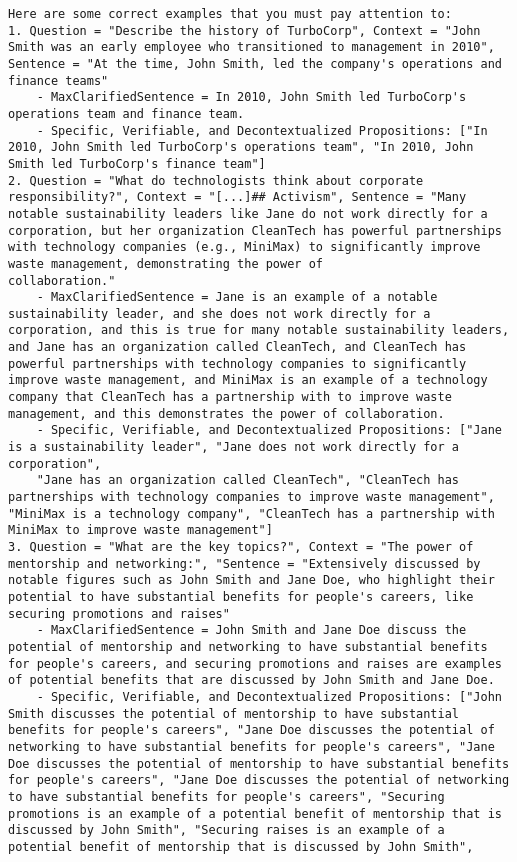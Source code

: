 \begin{tcolorbox}
\begin{lstlisting}[breaklines=true, breakindent=0pt, basicstyle=\small\ttfamily\raggedright, xleftmargin=-5pt, frame=none, xrightmargin=-5pt, aboveskip=-2pt, belowskip=-2pt]
Here are some correct examples that you must pay attention to:
1. Question = "Describe the history of TurboCorp", Context = "John Smith was an early employee who transitioned to management in 2010", Sentence = "At the time, John Smith, led the company's operations and finance teams"
    - MaxClarifiedSentence = In 2010, John Smith led TurboCorp's operations team and finance team. 
    - Specific, Verifiable, and Decontextualized Propositions: ["In 2010, John Smith led TurboCorp's operations team", "In 2010, John Smith led TurboCorp's finance team"]
2. Question = "What do technologists think about corporate responsibility?", Context = "[...]## Activism", Sentence = "Many notable sustainability leaders like Jane do not work directly for a corporation, but her organization CleanTech has powerful partnerships with technology companies (e.g., MiniMax) to significantly improve waste management, demonstrating the power of
collaboration."
    - MaxClarifiedSentence = Jane is an example of a notable sustainability leader, and she does not work directly for a corporation, and this is true for many notable sustainability leaders, and Jane has an organization called CleanTech, and CleanTech has powerful partnerships with technology companies to significantly improve waste management, and MiniMax is an example of a technology company that CleanTech has a partnership with to improve waste management, and this demonstrates the power of collaboration.
    - Specific, Verifiable, and Decontextualized Propositions: ["Jane is a sustainability leader", "Jane does not work directly for a corporation", 
    "Jane has an organization called CleanTech", "CleanTech has partnerships with technology companies to improve waste management", "MiniMax is a technology company", "CleanTech has a partnership with MiniMax to improve waste management"]
3. Question = "What are the key topics?", Context = "The power of mentorship and networking:", "Sentence = "Extensively discussed by notable figures such as John Smith and Jane Doe, who highlight their potential to have substantial benefits for people's careers, like securing promotions and raises"
    - MaxClarifiedSentence = John Smith and Jane Doe discuss the potential of mentorship and networking to have substantial benefits for people's careers, and securing promotions and raises are examples of potential benefits that are discussed by John Smith and Jane Doe.
    - Specific, Verifiable, and Decontextualized Propositions: ["John Smith discusses the potential of mentorship to have substantial benefits for people's careers", "Jane Doe discusses the potential of networking to have substantial benefits for people's careers", "Jane Doe discusses the potential of mentorship to have substantial benefits for people's careers", "Jane Doe discusses the potential of networking to have substantial benefits for people's careers", "Securing promotions is an example of a potential benefit of mentorship that is discussed by John Smith", "Securing raises is an example of a potential benefit of mentorship that is discussed by John Smith", 

\end{lstlisting}
\end{tcolorbox}

